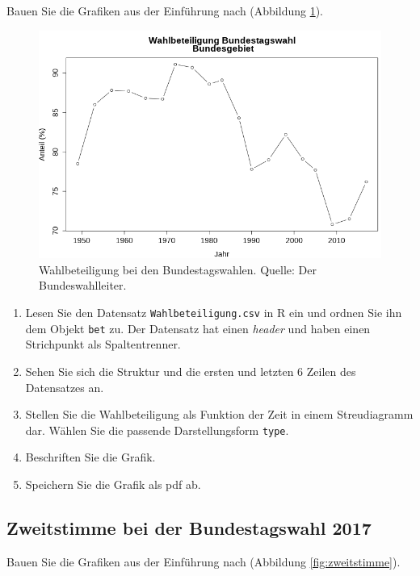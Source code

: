 \documentclass[]{book}
\providecommand{\tightlist}{%
  \setlength{\itemsep}{0pt}\setlength{\parskip}{0pt}}
\begin{document}
Bauen Sie die Grafiken aus der Einführung nach (Abbildung \ref{fig:wahlbeteiligung}).

\begin{figure}
\includegraphics[width=1\linewidth]{Wahlbeteiligung} \caption{Wahlbeteiligung bei den Bundestagswahlen. Quelle: Der Bundeswahlleiter.}\label{fig:wahlbeteiligung}
\end{figure}

\begin{enumerate}
\def\labelenumi{\arabic{enumi}.}
\tightlist
\item
  Lesen Sie den Datensatz \texttt{Wahlbeteiligung.csv} in R ein und ordnen Sie ihn dem Objekt \texttt{bet} zu. Der Datensatz hat einen \emph{header} und haben einen Strichpunkt als Spaltentrenner.
\item
  Sehen Sie sich die Struktur und die ersten und letzten 6 Zeilen des Datensatzes an.
\item
  Stellen Sie die Wahlbeteiligung als Funktion der Zeit in einem Streudiagramm dar. Wählen Sie die passende Darstellungsform \texttt{type}.
\item
  Beschriften Sie die Grafik.
\item
  Speichern Sie die Grafik als pdf ab.
\end{enumerate}

\hypertarget{zweitstimme}{%
\subsection{Zweitstimme bei der Bundestagswahl 2017}\label{zweitstimme}}

Bauen Sie die Grafiken aus der Einführung nach (Abbildung \ref{fig:zweitstimme}).
\end{document}

